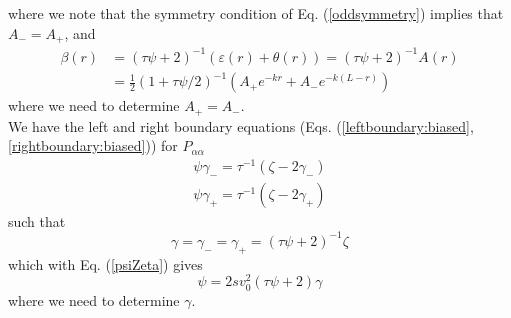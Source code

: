 \documentclass[pre,aps,superscriptaddress,nofootinbib]{revtex4}
\begin{document}
where we note that the symmetry condition of Eq. (\ref{oddsymmetry}) implies that $A_- = A_+$, and
\begin{equation}
\begin{aligned}
\beta(r) &= (\tau\psi + 2)^{-1}(\varepsilon(r) + \theta(r)) = (\tau \psi + 2)^{-1} A(r)\\
&= \frac{1}{2}(1 + \tau\psi/2)^{-1}(A_+ e^{-k r} + A_- e^{-k (L - r)})
\end{aligned}
\label{beta}
\end{equation}
where we need to determine $A_+ = A_-$.\\

We have the left and right boundary equations (Eqs. (\ref{leftboundary:biased}, \ref{rightboundary:biased})) for $P_{\alpha\alpha}$
\begin{eqnarray}
\psi \gamma_- = \tau^{-1} (\zeta - 2 \gamma_-)\\
\psi \gamma_+ = \tau^{-1} (\zeta - 2 \gamma_+)
\end{eqnarray}
such that
\begin{equation}
\gamma = \gamma_- = \gamma_+ = (\tau \psi + 2)^{-1} \zeta
\end{equation}
which with Eq. (\ref{psiZeta}) gives
\begin{equation}
\psi = 2 s v_0^2 (\tau \psi + 2) \gamma
\label{gammaPsi}
\end{equation}
where we need to determine $\gamma$.\\
\end{document}
